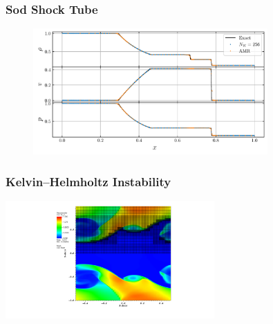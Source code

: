 \documentclass{beamer}
\begin{document}
\begin{frame}
\frametitle{Sod Shock Tube}

  \begin{figure}[htb!]
    \centering
    \includegraphics[width=0.8\textwidth]{fig.sod.pdf}
  \end{figure}

\end{frame}

\begin{frame}
\frametitle{Kelvin--Helmholtz Instability}

  \begin{center}
    {\includegraphics[width=0.6\textwidth]{fig.KHI.pdf}}
  \end{center}

\end{frame}
\end{document}
